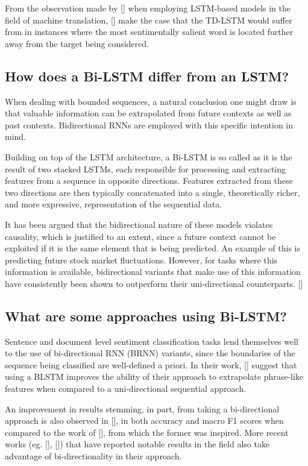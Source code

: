 \documentclass[12pt, a4paper]{report}
\theoremstyle{definition}
\theoremstyle{definition}%
\theoremstyle{definition}%
\theoremstyle{definition}%
\theoremstyle{definition}%
\theoremstyle{definition}%
\renewcommand{\cite}[1]{[\citealp{#1}]}
\begin{document}
From the observation made by \cite{bahdanau2014} when employing LSTM-based models in the field of machine translation, \cite{chen2017} make the case that the TD-LSTM would suffer from in instances where the most sentimentally salient word is located further away from the target being considered.

\subsection{How does a Bi-LSTM differ from an LSTM?}
When dealing with bounded sequences, a natural conclusion one  might draw is that valuable information can be extrapolated from future contexts as well as past contexts. Bidirectional RNNs are employed with this specific intention in mind.

Building on top of the LSTM architecture, a Bi-LSTM is so called as it is the result of two stacked LSTMs, each responsible for processing and extracting features from a sequence in opposite directions. Features extracted from these two directions are then typically concatenated into a single, theoretically richer, and more expressive, representation of the sequential data.

It has been argued that the bidirectional nature of these models violates causality, which is justified to an extent, since a future context cannot be exploited if it is the same element that is being predicted. An example of this is predicting future stock market fluctuations. However, for tasks where this information is available, bidirectional variants that make use of this information have consistently been shown to outperform their uni-directional counterparts. \cite{graves2012b}

\subsection{What are some approaches using Bi-LSTM?}
Sentence and document level sentiment classification tasks lend themselves well to the use of bi-directional RNN (BRNN) variants, since the boundaries of the sequence being classified are well-defined a priori. In their work, \cite{chen2017} suggest that using a BLSTM improves the ability of their approach to extrapolate phrase-like features when compared to a uni-directional sequential approach.

An improvement in results stemming, in part, from taking a bi-directional approach is also observed in \cite{zhang2016}, in both accuracy and macro F1 scores when compared to the work of \cite{vo2015}, from which the former was inspired. More recent works (eg. \cite{ma2018}, \cite{zheng2018}) that have reported notable results in the field also take advantage of bi-directionality in their approach.
\end{document}
